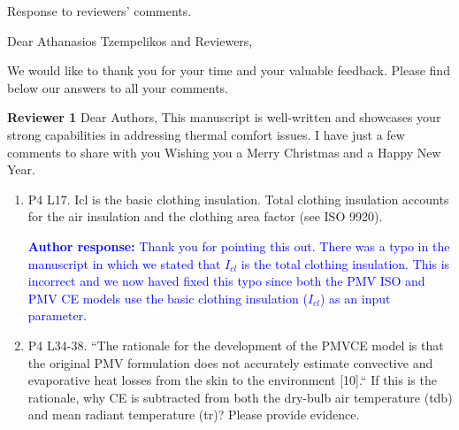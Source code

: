 \documentclass[a4paper, 10pt]{letter}
\newcommand{\response}[1]{\textcolor{blue}{\textbf{Author response:} #1}}
\begin{document}
    \begin{letter}
    {
        Response to reviewers' comments.
    }

        \opening{Dear Athanasios Tzempelikos and Reviewers,}


        We would like to thank you for your time and your valuable feedback.
        Please find below our answers to all your comments.

        \textbf{Reviewer 1}
        Dear Authors,
        This manuscript is well-written and showcases your strong capabilities in addressing thermal comfort issues.
        I have just a few comments to share with you Wishing you a Merry Christmas and a Happy New Year.

        \begin{enumerate}

            \item P4 L17.
            Icl is the basic clothing insulation.
            Total clothing insulation accounts for the air insulation and the clothing area factor (see ISO 9920).

            \response{
                Thank you for pointing this out.
                There was a typo in the manuscript in which we stated that $I_{cl}$ is the total clothing insulation.
                This is incorrect and we now haved fixed this typo since both the PMV ISO and PMV CE models use the basic clothing insulation ($I_{cl}$) as an input parameter.
            }

            \item P4 L34-38.
            ``The rationale for the development of the PMVCE model is that the original PMV
            formulation does not accurately estimate convective and evaporative heat losses from
            the skin to the environment [10].`` If this is the rationale, why CE is subtracted from both
            the dry-bulb air temperature (tdb) and mean radiant temperature (tr)?
            Please provide evidence.


\end{enumerate}
\end{letter}
\end{document}
